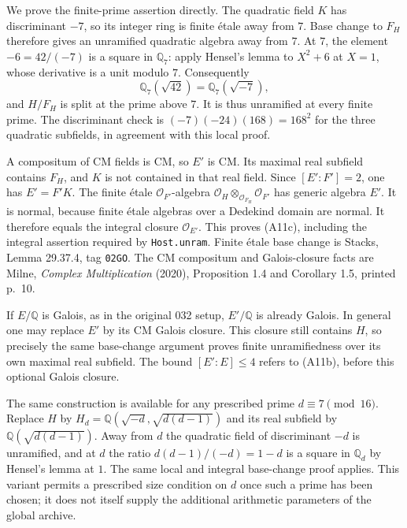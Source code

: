 \documentclass[11pt]{article}
\newcommand{\Q}{\mathbb Q}\newcommand{\C}{\mathbb C}\newcommand{\Z}{\mathbb Z}\newcommand{\R}{\mathbb R}\newcommand{\A}{\mathbb A}\newcommand{\OO}{\mathcal O}
\theoremstyle{definition}\newtheorem{definition}[theorem]{Definition}\newtheorem{remark}[theorem]{Remark}
\begin{document}
We prove the finite-prime assertion directly.  The quadratic field
$K$ has discriminant $-7$, so its integer ring is finite
\'etale away from $7$.  Base change to $F_H$ therefore gives
an unramified quadratic algebra away from $7$.  At $7$, the element
$-6=42/(-7)$ is a square in $\Q_7$: apply Hensel's lemma to
$X^2+6$ at $X=1$, whose derivative is a unit modulo $7$.
Consequently
\[
 \Q_7(\sqrt{42})=\Q_7(\sqrt{-7}),
\]
and $H/F_H$ is split at the prime above $7$.  It is thus unramified
at every finite prime.  The discriminant check is
$(-7)(-24)(168)=168^2$ for the three quadratic subfields, in
agreement with this local proof.

A compositum of CM fields is CM, so $E'$ is CM.  Its maximal real
subfield contains $F_H$, and $K$ is not contained in that real
field.  Since $[E':F']=2$, one has $E'=F'K$.  The finite
\'etale $\OO_{F'}$-algebra
$\OO_H\otimes_{\OO_{F_H}}\OO_{F'}$ has generic algebra $E'$.
It is normal, because finite \'etale algebras over a Dedekind
domain are normal.  It therefore equals the integral closure
$\OO_{E'}$.  This proves (A11c), including the integral assertion
required by \texttt{Host.unram}.  Finite \'etale base change
is Stacks, Lemma 29.37.4, tag \texttt{02GO}.  The CM compositum
and Galois-closure facts are Milne, \emph{Complex Multiplication}
(2020), Proposition 1.4 and Corollary 1.5, printed p.~10.

If $E/\Q$ is Galois, as in the original 032 setup, $E'/\Q$ is
already Galois.  In general one may replace $E'$ by its CM Galois
closure.  This closure still contains $H$, so precisely the same
base-change argument proves finite unramifiedness over its own
maximal real subfield.  The bound $[E':E]\leq4$ refers to (A11b),
before this optional Galois closure.

The same construction is available for any prescribed prime
$d\equiv7\pmod {16}$.  Replace $H$ by
$H_d=\Q(\sqrt{-d},\sqrt{d(d-1)})$ and its real subfield by
$\Q(\sqrt{d(d-1)})$.  Away from $d$ the quadratic field of
discriminant $-d$ is unramified, and at $d$ the ratio
$d(d-1)/(-d)=1-d$ is a square in $\Q_d$ by Hensel's lemma
at $1$.  The same local and integral base-change proof applies.
This variant permits a prescribed size condition on $d$
once such a prime has been chosen; it does not itself supply
the additional arithmetic parameters of the global archive.
\end{document}
